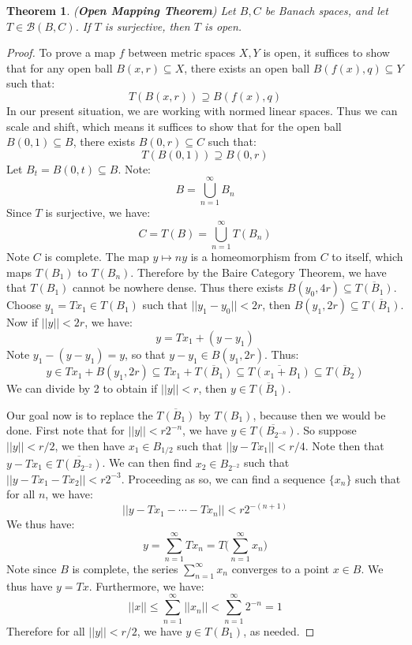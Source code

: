 \documentclass[a4paper,12pt]{report}
\newcommand{\ms}[1]{\mathscr{#1}}
\newcommand{\ovl}[1]{\overline{#1}}
\newcommand{\sse} {\subseteq}
\newtheorem{theorem}{Theorem}[section]
\begin{document}
	\begin{theorem}
	\emph{(\textbf{Open Mapping Theorem})}
	Let $B, C$ be Banach spaces, and let $T \in \ms{B}(B, C)$. If $T$ is surjective, then $T$ is open. 
	\end{theorem}
	\begin{proof}
	To prove a map $f$ between metric spaces $X, Y$ is open, it suffices to show that for any open ball $B(x, r) \sse X$, there exists an open ball $B(f(x), q) \sse Y$ such that:
	\[ T(B(x, r)) \supseteq B(f(x), q) \]
	In our present situation, we are working with normed linear spaces. Thus we can scale and shift, which means it suffices to show that for the open ball $B(0, 1) \sse B$, there exists $B(0, r) \sse C$ such that:
	\[ T(B(0, 1)) \supseteq B(0, r) \]
	Let $B_t = B(0, t) \sse B$. Note:
	\[ B = \bigcup_{n=1}^\infty B_n \]
	Since $T$ is surjective, we have:
	\[ C = T(B) = \bigcup_{n=1}^\infty T(B_n) \]
	Note $C$ is complete. The map $y \mapsto ny$ is a homeomorphism from $C$ to itself, which maps $T(B_1)$ to $T(B_n)$. Therefore by the Baire Category Theorem, we have that $T(B_1)$ cannot be nowhere dense. Thus there exists $B(y_0, 4r) \sse \ovl{T(B_1)}$. Choose $y_1 = Tx_1 \in T(B_1)$ such that $||y_1 - y_0|| < 2r$, then $B(y_1, 2r) \sse \ovl{T(B_1)}$. Now if $||y|| < 2r$, we have:
	\[ y = Tx_1 + (y - y_1) \]
	Note $y_1 - (y - y_1) = y$, so that $y - y_1 \in B(y_1, 2r)$. Thus:
	\[ y \in Tx_1 + B(y_1, 2r) \sse Tx_1 + \ovl{T(B_1)} \sse \ovl{T(x_1 + B_1)} \sse \ovl{T(B_2)} \]
	We can divide by 2 to obtain if $||y|| < r$, then $y \in \ovl{T(B_1)}$. 
	
	Our goal now is to replace the $\ovl{T(B_1)}$ by $T(B_1)$, because then we would be done. First note that for $||y|| < r2^{-n}$, we have $y \in \ovl{T(B_{2^{-n}})}$. So suppose $||y|| < r / 2$, we then have $x_1 \in B_{1/2}$ such that $||y - Tx_1|| < r/4$. Note then that $y - Tx_1 \in \ovl{T(B_{2^{-2}})}$. We can then find $x_2 \in B_{2^{-2}}$ such that $||y - Tx_1 - Tx_2|| < r2^{-3}$. Proceeding as so, we can find a sequence $\{x_n\}$ such that for all $n$, we have:
	\[ ||y - Tx_1 - \cdots - Tx_n|| < r2^{-(n+1)} \]
	We thus have:
	\[ y = \sum_{n=1}^\infty Tx_n = T\bigg(\sum_{n=1}^\infty x_n \bigg) \]
	Note since $B$ is complete, the series $\sum_{n=1}^\infty x_n$ converges to a point $x \in B$. We thus have $y = Tx$. Furthermore, we have:
	\[ ||x|| \leq \sum_{n=1}^\infty ||x_n|| < \sum_{n=1}^\infty 2^{-n} = 1 \]
	Therefore for all $||y|| < r/2$, we have $y \in T(B_1)$, as needed. 
	\end{proof}
	
\end{document}
